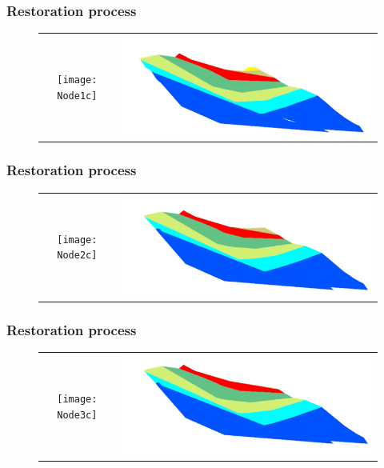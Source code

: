 \documentclass{beamer}
\begin{document}
		\begin{frame}
	\frametitle{Restoration process}
	\begin{figure}[H]
	\centering
	\begin{tabular}{@{}cc@{}}
	\texttt{[image: Node1c]}&
	\includegraphics[width=.65\textwidth]{chartreusedroite31.png}\\
	\end{tabular}
	\end{figure}
	\end{frame}
	
	\begin{frame}
	\frametitle{Restoration process}
	\begin{figure}[H]
	\centering
	\begin{tabular}{@{}cc@{}}
	\texttt{[image: Node2c]}&
	\includegraphics[width=.65\textwidth]{chartreusedroite32.png}\\
	\end{tabular}
	\end{figure}
	\end{frame}
	
	\begin{frame}
	\frametitle{Restoration process}
	\begin{figure}[H]
	\centering
	\begin{tabular}{@{}cc@{}}
	\texttt{[image: Node3c]}&
	\includegraphics[width=.65\textwidth]{chartreusedroite33.png}\\
	\end{tabular}
	\end{figure}
	\end{frame}
	
\end{document}
